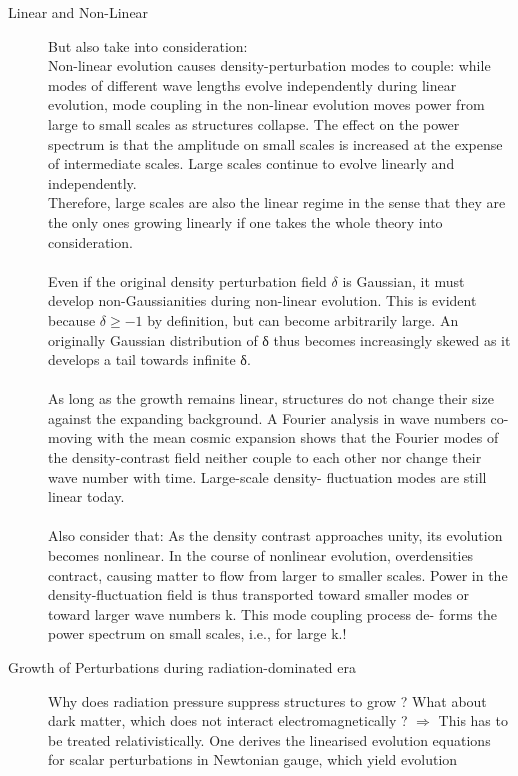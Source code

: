 \begin{description}
	\item[Linear and Non-Linear] But also take into consideration:\\
	Non-linear evolution causes density-perturbation modes to couple:
	while modes of different wave lengths evolve independently during
	linear evolution, mode coupling in the non-linear evolution moves
	power from large to small scales as structures collapse. The effect
	on the power spectrum is that the amplitude on small scales is
	increased at the expense of intermediate scales. Large scales
	continue to evolve linearly and independently.\\
	Therefore, large scales are also the linear regime in the sense that they are the only ones growing linearly if one takes the whole theory into consideration. \\
	\\
	Even if the original density perturbation field $\delta$ is Gaussian, it must
	develop non-Gaussianities during non-linear evolution. This is
	evident because $\delta \geq -1$ by definition, but can become arbitrarily
	large. An originally Gaussian distribution of δ thus becomes
	increasingly skewed as it develops a tail towards infinite δ.\\
	\\
	As long as the growth remains linear, structures do
	not change their size against the expanding background.
	A Fourier analysis in wave numbers co-moving with the
	mean cosmic expansion shows that the Fourier modes of
	the density-contrast field neither couple to each other nor
	change their wave number with time. Large-scale density-
	fluctuation modes are still linear today.\\
	\\
	Also consider that: As the density contrast approaches unity, its evolution
	becomes nonlinear. In the course of nonlinear evolution,
	overdensities contract, causing matter to flow from
	larger to smaller scales. Power in the density-fluctuation
	field is thus transported toward smaller modes or toward
	larger wave numbers k. This mode coupling process de-
	forms the power spectrum on small scales, i.e., for large
	k.!
	\item[Growth of Perturbations during radiation-dominated era] Why does radiation pressure suppress structures to grow ? What about dark matter, which does not interact electromagnetically ?
	$\Rightarrow$ This has to be treated relativistically. One derives the linearised evolution equations for scalar perturbations in Newtonian gauge, which yield evolution

\end{description}
